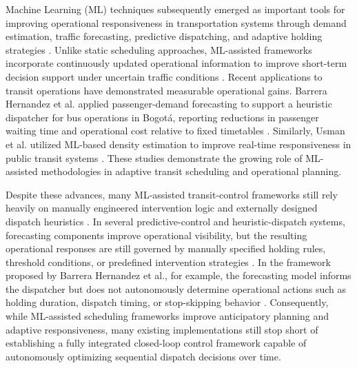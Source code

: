 Machine Learning (ML) techniques subsequently emerged as important tools for improving operational responsiveness in transportation systems through demand estimation, traffic forecasting, predictive dispatching, and adaptive holding strategies \cite{huang2019,patil2025}. Unlike static scheduling approaches, ML-assisted frameworks incorporate continuously updated operational information to improve short-term decision support under uncertain traffic conditions \cite{huang2019}. Recent applications to transit operations have demonstrated measurable operational gains. Barrera Hernandez et al. applied passenger-demand forecasting to support a heuristic dispatcher for bus operations in Bogotá, reporting reductions in passenger waiting time and operational cost relative to fixed timetables \cite{Barrera2025Optimization}. Similarly, Usman et al. utilized ML-based density estimation to improve real-time responsiveness in public transit systems \cite{Usman2025ML}. These studies demonstrate the growing role of ML-assisted methodologies in adaptive transit scheduling and operational planning.

Despite these advances, many ML-assisted transit-control frameworks still rely heavily on manually engineered intervention logic and externally designed dispatch heuristics \cite{alexandre2023}. In several predictive-control and heuristic-dispatch systems, forecasting components improve operational visibility, but the resulting operational responses are still governed by manually specified holding rules, threshold conditions, or predefined intervention strategies \cite{pang2019,verbich2021}. In the framework proposed by Barrera Hernandez et al., for example, the forecasting model informs the dispatcher but does not autonomously determine operational actions such as holding duration, dispatch timing, or stop-skipping behavior \cite{Barrera2025Optimization}. Consequently, while ML-assisted scheduling frameworks improve anticipatory planning and adaptive responsiveness, many existing implementations still stop short of establishing a fully integrated closed-loop control framework capable of autonomously optimizing sequential dispatch decisions over time.

